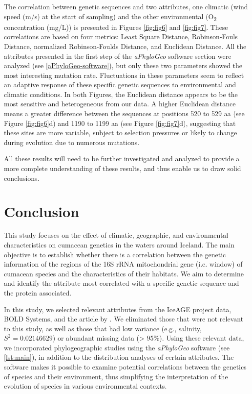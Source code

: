 The correlation between genetic sequences and two attributes, one climatic (wind speed (m/s) at the start of sampling) and the other environmental (O\textsubscript{2} concentration (mg/L)) is presented in Figures \ref{fig:fig6} and \ref{fig:fig7}. These correlations are based on four metrics: Least Square Distance, Robinson-Fouls Distance, normalized Robinson-Foulds Distance, and Euclidean Distance. All the attributes presented in the first step of the \textit{aPhyloGeo} software section were analyzed (see \ref{aPhyloGeo-software}), but only these two parameters showed the most interesting mutation rate. Fluctuations in these parameters seem to reflect an adaptive response of these specific genetic sequences to environmental and climatic conditions. In both Figures, the Euclidean distance appears to be the most sensitive and heterogeneous from our data. A higher Euclidean distance means a greater difference between the sequences at positions 520 to 529 aa (see Figure \ref{fig:fig6}d) and 1190 to 1199 aa (see Figure \ref{fig:fig7}d), suggesting that these sites are more variable, subject to selection pressures or likely to change during evolution due to numerous mutations. 

All these results will need to be further investigated and analyzed to provide a more complete understanding of these results, and thus enable us to draw solid conclusions.

\section{Conclusion}\label{conclusion}

This study focuses on the effect of climatic, geographic, and environmental characteristics on cumacean genetics in the waters around Iceland. The main objective is to establish whether there is a correlation between the genetic information of the regions of the 16S rRNA mitochondrial gene (i.e. window) of cumacean species and the characteristics of their habitats. We aim to determine and identify the attribute most correlated with a specific genetic sequence and the protein associated. 

In this study, we selected relevant attributes from the IceAGE project data, BOLD Systems, and the article by \citep{uhlir_adding_2021}. We eliminated those that were not relevant to this study, as well as those that had low variance (e.g., salinity, $S^2 = 0.02146629$) or abundant missing data (> 95\%). Using these relevant data, we incorporated phylogeographic studies using the \textit{aPhyloGeo} software (see \autoref{lst:main}), in addition to the distribution analyses of certain attributes. The software makes it possible to examine potential correlations between the genetics of species and their environment, thus simplifying the interpretation of the evolution of species in various environmental contexts.

